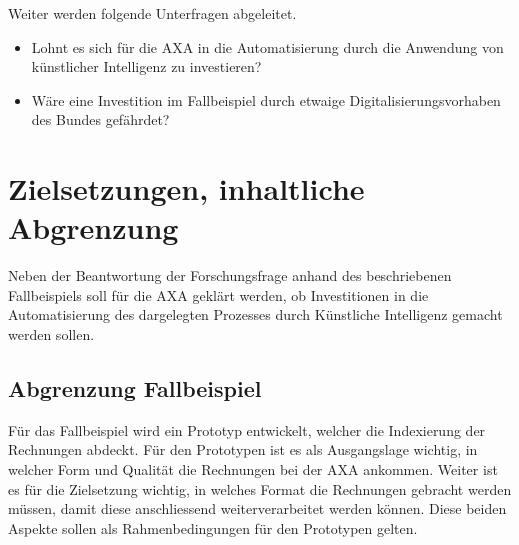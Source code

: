 \documentclass{hwz}
\begin{document}
Weiter werden folgende Unterfragen abgeleitet.


\begin{itemize}
    \item Lohnt es sich für die AXA in die Automatisierung durch die Anwendung von künstlicher Intelligenz zu investieren? 
    \item Wäre eine Investition im Fallbeispiel durch etwaige Digitalisierungsvorhaben des Bundes gefährdet? 
\end{itemize}

\newpage
\section{Zielsetzungen, inhaltliche Abgrenzung}


Neben der Beantwortung der Forschungsfrage anhand des beschriebenen Fallbeispiels soll für die AXA geklärt werden, ob Investitionen in die Automatisierung des dargelegten Prozesses durch Künstliche Intelligenz gemacht werden sollen.


\subsection{Abgrenzung Fallbeispiel}

Für das Fallbeispiel wird ein Prototyp entwickelt, welcher die Indexierung der Rechnungen abdeckt. Für den Prototypen ist es als Ausgangslage wichtig, in welcher Form und Qualität die Rechnungen bei der AXA ankommen. Weiter ist es für die Zielsetzung wichtig, in welches Format die Rechnungen gebracht werden müssen, damit diese anschliessend weiterverarbeitet werden können. Diese beiden Aspekte sollen als Rahmenbedingungen für den Prototypen gelten.
\end{document}
